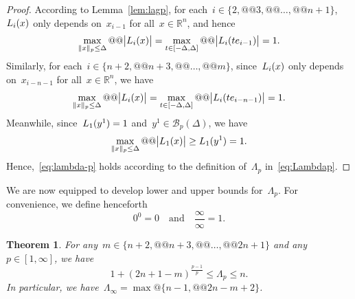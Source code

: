 \documentclass{article}
\theoremstyle{definition}
\theoremstyle{plain}
\newtheorem{theorem}{Theorem}[section]
\theoremstyle{remark}
\newcommand*{\abs}[2][]{#1\lvert#2#1\rvert}
\newcommand*{\norm}[2][]{#1\lVert#2#1\rVert}
\newcommand*{\set}[2][]{#1\{#2#1\}}
\newcommand*{\R}{\mathbb{R}}
\newcommand*{\lagp}[1][]{L\ifblank{#1}{}{_{#1}}}
\begin{document}
\begin{proof}
    According to Lemma~\ref{lem:lagp}, for each~$i \in \set{2, @@ 3, @@ \dots, @@ n + 1}$,~$\lagp[i](x)$ only depends on~$x_{i - 1}$ for all~$x \in \R^n$, and hence
    \begin{equation*}
        \max_{\norm{x}_p \le \Delta} @@ \abs[\big]{\lagp[i](x)} = \max_{t \in [-\Delta, \Delta]} @@ \abs[\big]{\lagp[i](t e_{i - 1})} = 1.
    \end{equation*}
    Similarly, for each~$i \in \set{n + 2, @@ n + 3, @@ \dots, @@ m}$, since~$\lagp[i](x)$ only depends on~$x_{i - n - 1}$ for all~$x \in \R^n$, we have
    \begin{equation*}
        \max_{\norm{x}_p \le \Delta} @@ \abs[\big]{\lagp[i](x)} = \max_{t \in [-\Delta, \Delta]} @@ \abs[\big]{\lagp[i](t e_{i - n - 1})} = 1.
    \end{equation*}
    Meanwhile, since~$\lagp[1](y^1) = 1$ and~$y^1 \in \mathcal{B}_p(\Delta)$, we have
    \begin{equation*}
        \max_{\norm{x}_p \le \Delta} @@ \abs[\big]{\lagp[1](x)} \ge \lagp[1](y^1) = 1.
    \end{equation*}
    Hence,~\eqref{eq:lambda-p} holds according to the definition of~$\Lambda_p$ in~\eqref{eq:Lambdap}.
\end{proof}

We are now equipped to develop lower and upper bounds for~$\Lambda_p$.
For convenience, we define henceforth
\begin{equation*}
    0^0 = 0 \quad \text{and} \quad \frac{\infty}{\infty} = 1.
\end{equation*}

\begin{theorem}
    \label{thm:bounds}
    For any~$m \in \set{n + 2, @@ n + 3, @@ \dots, @@ 2n + 1}$ and any~$p \in [1, \infty]$, we have
    \begin{equation}
        \label{eq:bounds}
        1 + (2n + 1 - m)^{\frac{p - 1}{p}} \le \Lambda_p \le n.
    \end{equation}
    In particular, we have~$\Lambda_{\infty} = \max @ \set{n - 1, @@ 2n - m + 2}$.
\end{theorem}
\end{document}
